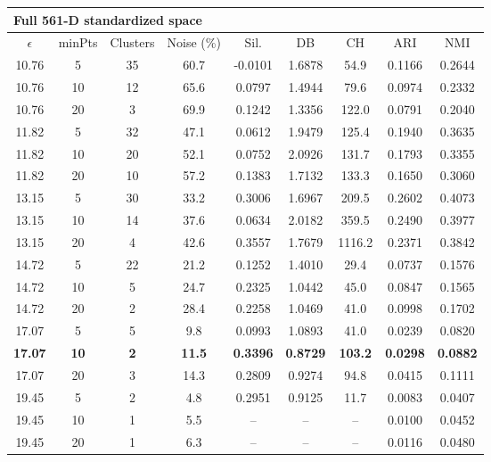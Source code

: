 \documentclass[12pt,a4paper]{article}
\begin{document}
\begin{longtable}{ccccccccc}
\multicolumn{9}{l}{\textbf{Full 561-D standardized space}} \\
\toprule
$\epsilon$ & minPts & Clusters & Noise (\%) & Sil. & DB & CH & ARI & NMI \\
\midrule
10.76 & 5 & 35 & 60.7 & -0.0101 & 1.6878 & 54.9 & 0.1166 & 0.2644 \\
10.76 & 10 & 12 & 65.6 & 0.0797 & 1.4944 & 79.6 & 0.0974 & 0.2332 \\
10.76 & 20 & 3 & 69.9 & 0.1242 & 1.3356 & 122.0 & 0.0791 & 0.2040 \\
11.82 & 5 & 32 & 47.1 & 0.0612 & 1.9479 & 125.4 & 0.1940 & 0.3635 \\
11.82 & 10 & 20 & 52.1 & 0.0752 & 2.0926 & 131.7 & 0.1793 & 0.3355 \\
11.82 & 20 & 10 & 57.2 & 0.1383 & 1.7132 & 133.3 & 0.1650 & 0.3060 \\
13.15 & 5 & 30 & 33.2 & 0.3006 & 1.6967 & 209.5 & 0.2602 & 0.4073 \\
13.15 & 10 & 14 & 37.6 & 0.0634 & 2.0182 & 359.5 & 0.2490 & 0.3977 \\
13.15 & 20 & 4 & 42.6 & 0.3557 & 1.7679 & 1116.2 & 0.2371 & 0.3842 \\
14.72 & 5 & 22 & 21.2 & 0.1252 & 1.4010 & 29.4 & 0.0737 & 0.1576 \\
14.72 & 10 & 5 & 24.7 & 0.2325 & 1.0442 & 45.0 & 0.0847 & 0.1565 \\
14.72 & 20 & 2 & 28.4 & 0.2258 & 1.0469 & 41.0 & 0.0998 & 0.1702 \\
17.07 & 5 & 5 & 9.8 & 0.0993 & 1.0893 & 41.0 & 0.0239 & 0.0820 \\
\textbf{17.07} & \textbf{10} & \textbf{2} & \textbf{11.5} & \textbf{0.3396} & \textbf{0.8729} & \textbf{103.2} & \textbf{0.0298} & \textbf{0.0882} \\
17.07 & 20 & 3 & 14.3 & 0.2809 & 0.9274 & 94.8 & 0.0415 & 0.1111 \\
19.45 & 5 & 2 & 4.8 & 0.2951 & 0.9125 & 11.7 & 0.0083 & 0.0407 \\
19.45 & 10 & 1 & 5.5 & -- & -- & -- & 0.0100 & 0.0452 \\
19.45 & 20 & 1 & 6.3 & -- & -- & -- & 0.0116 & 0.0480 \\
\bottomrule
\end{longtable}
\end{document}
